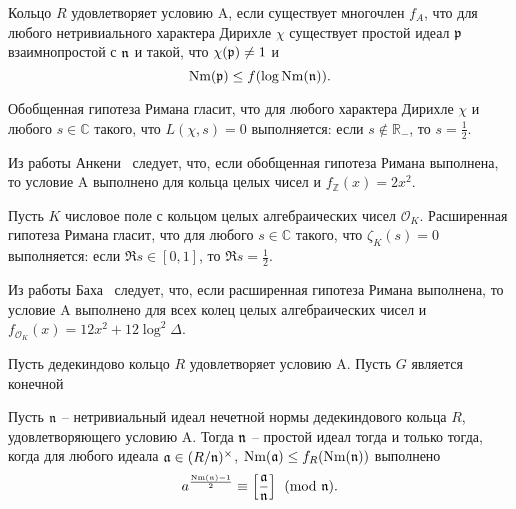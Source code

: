 \documentclass[_00_dissertation.tex]{subfiles}
\begin{document}
\begin{definition}
    Кольцо $R$ удовлетворяет условию A, если существует многочлен $f_A$, что для любого нетривиального характера Дирихле $\chi$ существует простой идеал $\mathfrak{p}$ взаимнопростой с $\mathfrak{n}$ и такой, что $\chi(\mathfrak{p}) \neq 1$ и
    \begin{equation*}
        \textrm{Nm}(\mathfrak{p}) \le f(\log{\textrm{Nm}(\mathfrak{n})}).
    \end{equation*}
\end{definition}

\begin{remark}
    Обобщенная гипотеза Римана гласит, что для любого характера Дирихле $\chi$ и любого $s \in \mathbb{C}$ такого, что $L(\chi, s) = 0$ выполняется: если $s \not\in \mathbb{R}_{-}$, то $s = \frac{1}{2}$.

    Из работы Анкени~\cite{Ankeny} следует, что, если обобщенная гипотеза Римана выполнена, то условие A выполнено для кольца целых чисел и $f_{\mathbb{Z}}(x) = 2x^2$.
\end{remark}

\begin{remark}
    Пусть $K$ числовое поле с кольцом целых алгебраических чисел $\mathcal{O}_K$.
    Расширенная гипотеза Римана гласит, что для любого $s \in \mathbb{C}$ такого, что $\zeta_K(s) = 0$ выполняется: если $\Re{s} \in [0, 1]$, то $\Re{s} = \frac{1}{2}$.

    Из работы Баха~\cite{Bach} следует, что, если расширенная гипотеза Римана выполнена, то условие A выполнено для всех колец целых алгебраических чисел и $f_{\mathcal{O}_K}(x) = 12x^2 + 12\log^2 \Delta$.
\end{remark}

\begin{proposition}
    Пусть дедекиндово кольцо $R$ удовлетворяет условию A.
    Пусть $G$ является конечной
\end{proposition}

\begin{theorem}\label{theorem:euler_criteria_deterministic}
    Пусть $\mathfrak{n}$ -- нетривиальный идеал нечетной нормы дедекиндового кольца $R$, удовлетворяющего условию A.
    Тогда $\mathfrak{n}$ -- простой идеал тогда и только тогда, когда для любого идеала $\mathfrak{a} \in (R/\mathfrak{n})^{\times}$, $\textrm{Nm}(\mathfrak{a}) \le f_R(\textrm{Nm}(\mathfrak{n}))$ выполнено
    \begin{equation*}
        a^{\frac{\textrm{Nm}(\mathfrak{n}) - 1}{2}} \equiv \left[\frac{\mathfrak{a}}{\mathfrak{n}}\right] \pmod{\mathfrak{n}}.
    \end{equation*}
\end{theorem}
\end{document}
